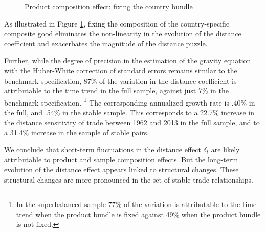 \documentclass[12pt,twoside,a4paper,notitlepage]{article}
\begin{document}
\begin{figure}[h!]
\caption{Product composition effect: fixing the country bundle  \label{fig:compbundle}}
\begin{center}
\setlength{\fboxrule}{1pt} %
\setlength{\fboxsep}{.1in} %
\end{center}
\end{figure}

As illustrated in Figure \ref{fig:compbundle}, fixing the composition of the country-specific composite good  eliminates the non-linearity in the evolution of the distance coefficient and \fi
exacerbates the magnitude of the distance puzzle.

Further, while the degree of precision in the estimation of the gravity equation with the Huber-White correction of standard errors remains similar to the benchmark specification, 87\% of the variation in the distance coefficient is attributable to the time trend in the full sample, against just 7\% in the benchmark specification.
\footnote{In the superbalanced sample 77\% of the variation is attributable to the time trend when the product bundle is fixed against 49\% when the product bundle is not fixed.}
The corresponding annualized growth rate is .40\% in the full, and .54\% in the stable sample.
This corresponds to a 22.7\% increase in the distance sensitivity of trade between 1962 and 2013 in the full sample, and to a 31.4\% increase in the sample of stable pairs.

We conclude that short-term fluctuations in the distance effect $\delta_t$ are likely attributable to product and sample composition effects.
But the long-term evolution of the distance effect appears linked to structural changes.
These structural changes are more pronounced in the set of stable trade relationships.

\end{document}
